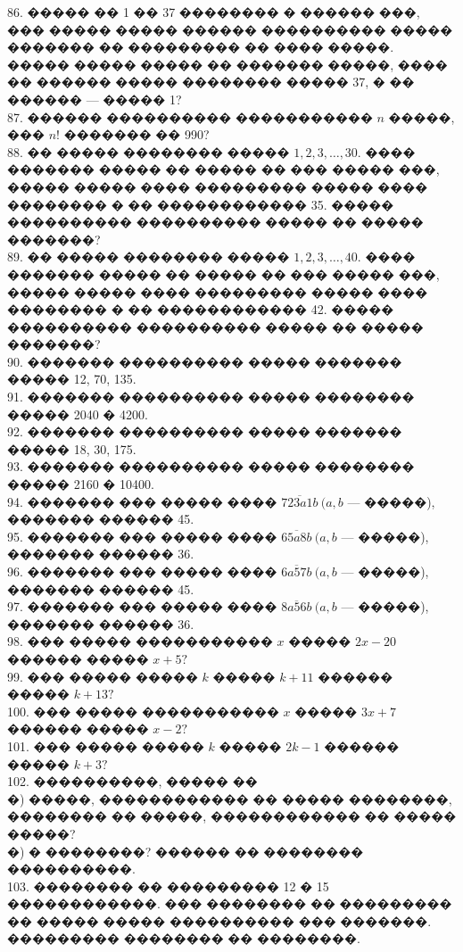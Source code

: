 \documentclass[12pt]{article}
\begin{document}
86. ����� �� 1 �� 37 �������� � ������ ���, ��� ����� ����� ������ ���������� ����� ������� �� ��������� �� ���� �����. ����� ����� ����� �� ������� �����, ���� �� ������ ����� �������� ����� 37, � �� ������ --- ����� 1?\\
87. ������ ���������� ����������� $n$ �����, ��� $n!$ ������� �� 990?\\
88. �� ����� �������� ����� $1, 2, 3,\ldots, 30.$ ���� ������� ����� �� ����� �� ��� ����� ���, ����� ����� ���� ��������� ����� ���� �������� � �� ������������ 35. ����� ���������� ���������� ����� �� ����� �������?\\
89. �� ����� �������� ����� $1, 2, 3,\ldots, 40.$ ���� ������� ����� �� ����� �� ��� ����� ���, ����� ����� ���� ��������� ����� ���� �������� � �� ������������ 42. ����� ���������� ���������� ����� �� ����� �������?\\
90. ������� ���������� ����� ������� ����� 12, 70, 135.\\
91. ������� ���������� ����� �������� ����� 2040 � 4200.\\
92. ������� ���������� ����� ������� ����� 18, 30, 175.\\
93. ������� ���������� ����� �������� ����� 2160 � 10400.\\
94. ������� ��� ����� ���� $\overline{723a1b}\ (a,b$ --- �����), ������� ������ 45.\\
95. ������� ��� ����� ���� $\overline{65a8b}\ (a,b$ --- �����), ������� ������ 36.\\
96. ������� ��� ����� ���� $\overline{6a57b}\ (a,b$ --- �����), ������� ������ 45.\\
97. ������� ��� ����� ���� $\overline{8a56b}\ (a,b$ --- �����), ������� ������ 36.\\
98. ��� ����� ����������� $x$ ����� $2x-20$ ������ ����� $x+5?$\\
99. ��� ����� ����� $k$ ����� $k+11$ ������ ����� $k+13?$\\
100. ��� ����� ����������� $x$ ����� $3x+7$ ������ ����� $x-2?$\\
101. ��� ����� ����� $k$ ����� $2k-1$ ������ ����� $k+3?$\\
102. ����������, ����� ��\\
�) �����, ������������ �� ����� ��������, �������� �� �����, ������������ �� ����� �����?\\
�) � ��������? ������ �� �������� ����������.\\
103. �������� �� ��������� 12 � 15 ������������. ��� �������� �� ��������� �� ����� ����� ���������� ��� �������. ��������� �������� �� ��������.\\
\end{document}
